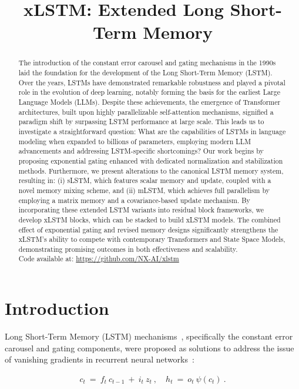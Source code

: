 \title{xLSTM: Extended Long Short-Term Memory}

\begin{abstract}
The introduction of the constant error carousel and gating mechanisms in the 1990s laid the foundation for the development of the Long Short-Term Memory (LSTM). Over the years, LSTMs have demonstrated remarkable robustness and played a pivotal role in the evolution of deep learning, notably forming the basis for the earliest Large Language Models (LLMs). Despite these achievements, the emergence of Transformer architectures, built upon highly parallelizable self-attention mechanisms, signified a paradigm shift by surpassing LSTM performance at large scale. This leads us to investigate a straightforward question: What are the capabilities of LSTMs in language modeling when expanded to billions of parameters, employing modern LLM advancements and addressing LSTM-specific shortcomings? Our work begins by proposing exponential gating enhanced with dedicated normalization and stabilization methods. Furthermore, we present alterations to the canonical LSTM memory system, resulting in: (i) sLSTM, which features scalar memory and update, coupled with a novel memory mixing scheme, and (ii) mLSTM, which achieves full parallelism by employing a matrix memory and a covariance-based update mechanism. By incorporating these extended LSTM variants into residual block frameworks, we develop xLSTM blocks, which can be stacked to build xLSTM models. The combined effect of exponential gating and revised memory designs significantly strengthens the xLSTM’s ability to compete with contemporary Transformers and State Space Models, demonstrating promising outcomes in both effectiveness and scalability.\\
Code available at: \url{https://github.com/NX-AI/xlstm}
\end{abstract}

\section{Introduction}
\label{sec:intro}

Long Short-Term Memory (LSTM) mechanisms~\citep{Hochreiter:91,Hochreiter:97nips,Hochreiter:97}, specifically the constant error carousel and gating components, were proposed as solutions to address the issue of vanishing gradients in recurrent neural networks~\citep{Hochreiter:91,Hochreiter:00book}:

\begin{align}
\label{eq:lstm_idea}
  c_t \ = \ f_t \ c_{t-1} \ + \ 
          i_t \  z_t \ , \quad  
          h_t \ = \ o_t \ \psi({c_t}) \ . 
\end{align}

